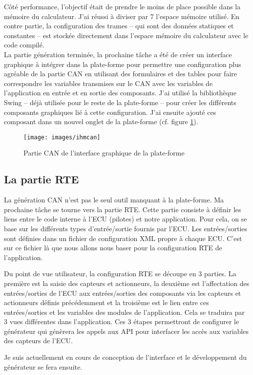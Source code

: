 Côté performance, l'objectif était de prendre le moins de place possible dans la mémoire du calculateur. J'ai réussi à diviser par 7 l'espace mémoire utilisé. En contre partie, la configuration des trames -- qui sont des données statiques et constantes -- est stockée directement dans l'espace mémoire du calculateur avec le code compilé.\\

La partie génération terminée, la prochaine tâche a été de créer un interface graphique à intégrer dans la plate-forme pour permettre une configuration plus agréable de la partie CAN en utilisant des formulaires et des tables pour faire correspondre les variables transmises sur le CAN avec les variables de l'application en entrée et en sortie des composants. J'ai utilisé la bibliothèque Swing -- déjà utilisée pour le reste de la plate-forme -- pour créer les différents composants graphiques lié à cette configuration. J'ai ensuite ajouté ces composant dans un nouvel onglet de la plate-forme (cf. figure \ref{fig:ihmcan}).


\begin{figure}[h]
  \centering
  \texttt{[image: images/ihmcan]}
  \caption{Partie CAN de l'interface graphique de la plate-forme}
  \label{fig:ihmcan}
\end{figure}


\subsection{La partie RTE}
La génération CAN n'est pas le seul outil manquant à la plate-forme. Ma prochaine tâche se tourne vers la partie RTE.
Cette partie consiste à définir les liens entre le code interne à l'ECU (pilotes) et notre application. Pour cela, on se base sur les
différents types d'entrée/sortie fournis par l'ECU. Les entrées/sorties sont définies dans un fichier de configuration XML
propre à chaque ECU. C'est sur ce fichier là que nous allons nous baser pour la configuration RTE de l'application.

Du point de vue utilisateur, la configuration RTE se découpe en 3 parties. La première est la saisie des capteurs
et actionneurs, la deuxième est l'affectation des entrées/sorties de l'ECU aux entrées/sorties des composants
via les capteurs et actionneurs définis précédemment et la troisième est le lien entre ces entrées/sorties et les
variables des modules de l'application. Cela se traduira par 3 vues différentes dans l'application. Ces 3 étapes
permettront de configurer le générateur qui génèrera les appels aux API pour interfacer les accès aux variables des capteurs de l'ECU.

Je suis actuellement en cours de conception de l'interface et le développement du générateur se fera ensuite.


